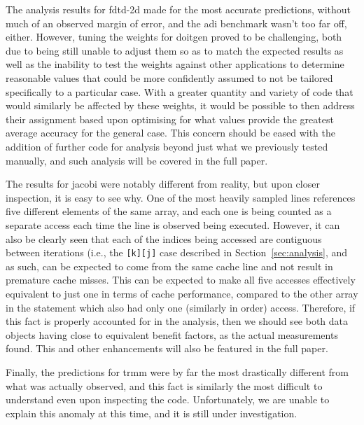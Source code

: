 The analysis results for fdtd-2d made for the most accurate predictions, without much of an observed margin of error, and the adi benchmark wasn't too far off, either.
However, tuning the weights for doitgen proved to be challenging, both due to being still unable to adjust them so as to match the expected results as well as the inability to test the weights against other applications to determine reasonable values that could be more confidently assumed to not be tailored specifically to a particular case.
With a greater quantity and variety of code that would similarly be affected by these weights, it would be possible to then address their assignment based upon optimising for what values provide the greatest average accuracy for the general case.
This concern should be eased with the addition of further code for analysis beyond just what we previously tested manually, and such analysis will be covered in the full paper.

The results for jacobi were notably different from reality, but upon closer inspection, it is easy to see why.
One of the most heavily sampled lines references five different elements of the same array, and each one is being counted as a separate access each time the line is observed being executed.
However, it can also be clearly seen that each of the indices being accessed are contiguous between iterations (i.e., the \texttt{[k][j]} case described in Section~\ref{sec:analysis}, and as such, can be expected to come from the same cache line and not result in premature cache misses.
This can be expected to make all five accesses effectively equivalent to just one in terms of cache performance, compared to the other array in the statement which also had only one (similarly in order) access.
Therefore, if this fact is properly accounted for in the analysis, then we should see both data objects having close to equivalent benefit factors, as the actual measurements found.
This and other enhancements will also be featured in the full paper.

Finally, the predictions for trmm were by far the most drastically different from what was actually observed, and this fact is similarly the most difficult to understand even upon inspecting the code.
Unfortunately, we are unable to explain this anomaly at this time, and it is still under investigation.
